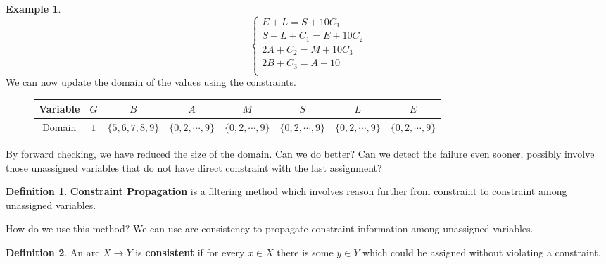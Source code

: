 \documentclass{article}
\theoremstyle{definition}
\newtheorem{definition}{Definition}[section]
\newtheorem{example}{Example}[definition]
\begin{document}
\begin{example}
\begin{equation*}
\begin{cases}
			E+L=S+10C_{1}\\
			S+L+C_{1}=E+10C_{2}\\
			2A+C_{2}=M+10C_{3}\\
			2B+C_{3}=A+10\\
		\end{cases}
	\end{equation*}
	We can now update the domain of the values using the constraints.
	\begin{figure}[h]
		\centering
		\begin{tabular}{|c||c|c|c|c|c|c|c|}
			\hline
			Variable & $G$ & $B$ & $A$ & $M$ & $S$ & $L$ & $E$\\
			\hline
			Domain & $1$ & $\{5,6,7,8,9\}$ & $\{0,2,\cdots,9\}$ & $\{0,2,\cdots,9\}$ & $\{0,2,\cdots,9\}$ & $\{0,2,\cdots,9\}$ & $\{0,2,\cdots,9\}$\\
			\hline
		\end{tabular}
	\end{figure}
\end{example}
By forward checking, we have reduced the size of the domain. Can we do better? Can we detect the failure even sooner, possibly involve those unassigned variables that do not have direct constraint with the last assignment?
\begin{definition}
	\textbf{Constraint Propagation} is a filtering method which involves reason further from constraint to constraint among unassigned variables.
\end{definition}
How do we use this method? We can use arc consistency to propagate constraint information among unassigned variables.
\begin{definition}
	An arc $X\to Y$ is \textbf{consistent} if for every $x\in X$ there is some $y\in Y$ which could be assigned without violating a constraint.
\end{definition}
\end{document}

